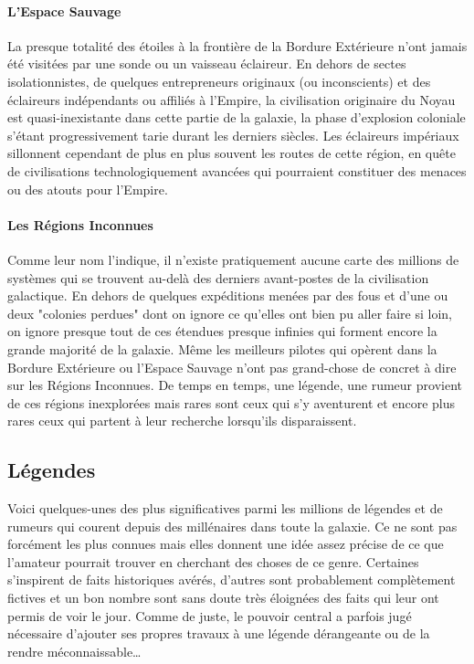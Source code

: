 \documentclass[twoside]{article}
\begin{document}
\paragraph{L’Espace Sauvage}
La presque totalité des étoiles à la frontière de la Bordure Extérieure n'ont jamais été visitées par une sonde ou un vaisseau éclaireur. En dehors de sectes isolationnistes, de quelques entrepreneurs originaux (ou inconscients) et des éclaireurs indépendants ou affiliés à l'Empire, la civilisation originaire du Noyau est quasi-inexistante dans cette partie de la galaxie, la phase d'explosion coloniale s'étant progressivement tarie durant les derniers siècles. Les éclaireurs impériaux sillonnent cependant de plus en plus souvent les routes de cette région, en quête de civilisations technologiquement avancées qui pourraient constituer des menaces ou des atouts pour l'Empire.

\paragraph{Les Régions Inconnues}
Comme leur nom l'indique, il n'existe pratiquement aucune carte des millions de systèmes qui se trouvent au-delà des derniers avant-postes de la civilisation galactique. En dehors de quelques expéditions menées par des fous et d'une ou deux "colonies perdues" dont on ignore ce qu'elles ont bien pu aller faire si loin, on ignore presque tout de ces étendues presque infinies qui forment encore la grande majorité de la galaxie. Même les meilleurs pilotes qui opèrent dans la Bordure Extérieure ou l'Espace Sauvage n'ont pas grand-chose de concret à dire sur les Régions Inconnues. De temps en temps, une légende, une rumeur provient de ces régions inexplorées mais rares sont ceux qui s'y aventurent et encore plus rares ceux qui partent à leur recherche lorsqu'ils disparaissent.

\subsection{Légendes}
Voici quelques-unes des plus significatives parmi les millions de légendes et de rumeurs qui courent depuis des millénaires dans toute la galaxie. Ce ne sont pas forcément les plus connues mais elles donnent une idée assez précise de ce que l'amateur pourrait trouver en cherchant des choses de ce genre. Certaines s'inspirent de faits historiques avérés, d'autres sont probablement complètement fictives et un bon nombre sont sans doute très éloignées des faits qui leur ont permis de voir le jour. Comme de juste, le pouvoir central a parfois jugé nécessaire d'ajouter ses propres travaux à une légende dérangeante ou de la rendre méconnaissable\ldots
\end{document}
